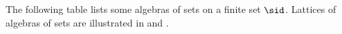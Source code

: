 {%
% 

\begin{example}
\label{ex:set_asets}
The following table lists some algebras of sets on a finite set $\sid$.
Lattices of algebras of sets are illustrated in  and %
.


\end{example}}
